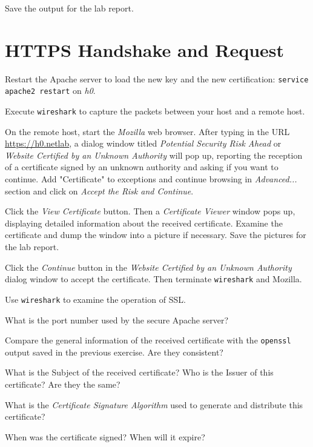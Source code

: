 \documentclass{../UTNetLab}
\begin{document}
    Save the output for the lab report.

\section{HTTPS Handshake and Request}
    Restart the Apache server to load the new key and the new certification: \lstinline{service apache2 restart} on \textit{h0}.

    Execute \lstinline{wireshark} to capture the packets between your host and a remote host.

    On the remote host, start the \textit{Mozilla} web browser.
    After typing in the URL \url{https://h0.netlab}, a dialog window titled \textit{Potential Security Risk Ahead} or \textit{Website Certified by an Unknown Authority} will pop up, reporting the reception of a certificate signed by an unknown authority and asking if you want to continue.
    Add "Certificate" to exceptions and continue browsing in \textit{Advanced...} section and click on \textit{Accept the Risk and Continue}.

    Click the \textit{View Certificate} button.
    Then a \textit{Certificate Viewer} window pops up, displaying detailed information about the received certificate.
    Examine the certificate and dump the window into a picture if necessary.
    Save the pictures for the lab report.

    Click the \textit{Continue} button in the \textit{Website Certified by an Unknown Authority} dialog window to accept the certificate.
    Then terminate \lstinline{wireshark} and Mozilla.

    Use \lstinline{wireshark} to examine the operation of SSL.

    \begin{report}
    \item What is the port number used by the secure Apache server?
    
    \item Compare the general information of the received certificate with the \lstinline{openssl} output saved in the previous exercise.
    Are they consistent?
    
    \item What is the Subject of the received certificate? Who is the Issuer of this certificate? Are they the same?
    
    \item What is the \textit{Certificate Signature Algorithm} used to generate and distribute this certificate?
    
    \item When was the certificate signed? When will it expire?
    \end{report}
\end{document}
